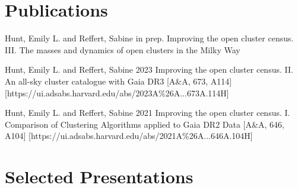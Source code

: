 \documentclass[12pt, letterpaper]{hunt-cv}
\begin{document}


\section*{Publications}

\begin{etaremune}
    \item \publication
        {Hunt, Emily L. and Reffert, Sabine}
        {in prep.}
        {Improving the open cluster census. III. The masses and dynamics of open clusters in the Milky Way}
    \item \publication
        {Hunt, Emily L. and Reffert, Sabine}
        {2023}
        {Improving the open cluster census. II. An all-sky cluster catalogue with Gaia DR3}
        [A\&A, 673, A114]
        [https://ui.adsabs.harvard.edu/abs/2023A\%26A...673A.114H]
    \item \publication
        {Hunt, Emily L. and Reffert, Sabine}
        {2021}
        {Improving the open cluster census. I. Comparison of Clustering Algorithms applied to Gaia DR2 Data}
        [A\&A, 646, A104]
        [https://ui.adsabs.harvard.edu/abs/2021A\%26A...646A.104H]
\end{etaremune}


\section*{Selected Presentations}
\end{document}
